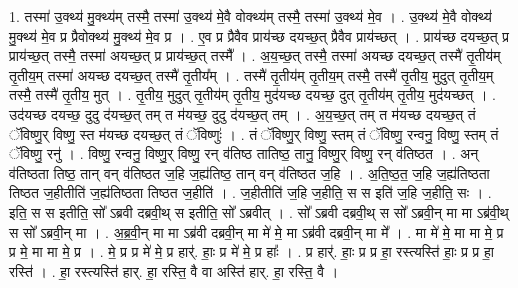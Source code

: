 \documentclass[17pt]{extarticle}
\begin{document}
1. तस्मा॑ उ॒क्थ्य॑ मु॒क्थ्य॑म् तस्मै॒ तस्मा॑ उ॒क्थ्य॑ मे॒वै वोक्थ्य॑म् तस्मै॒ तस्मा॑ उ॒क्थ्य॑ मे॒व । . उ॒क्थ्य॑ मे॒वै वोक्थ्य॑ मु॒क्थ्य॑ मे॒व प्र प्रैवोक्थ्य॑ मु॒क्थ्य॑ मे॒व प्र । . ए॒व प्र प्रैवैव प्राय॑च्छ दयच्छ॒त् प्रैवैव प्राय॑च्छत् । . प्राय॑च्छ दयच्छ॒त् प्र प्राय॑च्छ॒त् तस्मै॒ तस्मा॑ अयच्छ॒त् प्र प्राय॑च्छ॒त् तस्मै᳚ । . अ॒य॒च्छ॒त् तस्मै॒ तस्मा॑ अयच्छ दयच्छ॒त् तस्मै॑ तृ॒तीय॑म् तृ॒तीय॒म् तस्मा॑ अयच्छ दयच्छ॒त् तस्मै॑ तृ॒तीय᳚म् । . तस्मै॑ तृ॒तीय॑म् तृ॒तीय॒म् तस्मै॒ तस्मै॑ तृ॒तीय॒ मुदुत् तृ॒तीय॒म् तस्मै॒ तस्मै॑ तृ॒तीय॒ मुत् । . तृ॒तीय॒ मुदुत् तृ॒तीय॑म् तृ॒तीय॒ मुद॑यच्छ दयच्छ॒ दुत् तृ॒तीय॑म् तृ॒तीय॒ मुद॑यच्छत् । . उद॑यच्छ दयच्छ॒ दुदु द॑यच्छ॒त् तम् त म॑यच्छ॒ दुदु द॑यच्छ॒त् तम् । . अ॒य॒च्छ॒त् तम् त म॑यच्छ दयच्छ॒त् तं ॅविष्णु॒र् विष्णु॒ स्त म॑यच्छ दयच्छ॒त् तं ॅविष्णुः॑ । . तं ॅविष्णु॒र् विष्णु॒ स्तम् तं ॅविष्णु॒ रन्वनु॒ विष्णु॒ स्तम् तं ॅविष्णु॒ रनु॑ । . विष्णु॒ रन्वनु॒ विष्णु॒र् विष्णु॒ रन् व॑तिष्ठ तातिष्ठ॒ तानु॒ विष्णु॒र् विष्णु॒ रन् व॑तिष्ठत । . अन् व॑तिष्ठता तिष्ठ॒ तान् वन् व॑तिष्ठत ज॒हि ज॒ह्य॑तिष्ठ॒ तान् वन् व॑तिष्ठत ज॒हि । . अ॒ति॒ष्ठ॒त॒ ज॒हि ज॒ह्य॑तिष्ठता तिष्ठत ज॒हीतीति॑ ज॒ह्य॑तिष्ठता तिष्ठत ज॒हीति॑ । . ज॒हीतीति॑ ज॒हि ज॒हीति॒ स स इति॑ ज॒हि ज॒हीति॒ सः । . इति॒ स स इतीति॒ सो᳚ ऽब्रवी दब्रवी॒थ् स इतीति॒ सो᳚ ऽब्रवीत् । . सो᳚ ऽब्रवी दब्रवी॒थ् स सो᳚ ऽब्रवी॒न् मा मा ऽब्र॑वी॒थ् स सो᳚ ऽब्रवी॒न् मा । . अ॒ब्र॒वी॒न् मा मा ऽब्र॑वी दब्रवी॒न् मा मे॑ मे॒ मा ऽब्र॑वी दब्रवी॒न् मा मे᳚ । . मा मे॑ मे॒ मा मा मे॒ प्र प्र मे॒ मा मा मे॒ प्र । . मे॒ प्र प्र मे॑ मे॒ प्र हार्॑. हाः॒ प्र मे॑ मे॒ प्र हाः᳚ । . प्र हार्॑. हाः॒ प्र प्र हा॒ रस्त्यस्ति॑ हाः॒ प्र प्र हा॒ रस्ति॑ । . हा॒ रस्त्यस्ति॑ हार्. हा॒ रस्ति॒ वै वा अस्ति॑ हार्. हा॒ रस्ति॒ वै । \newline
\end{document}
